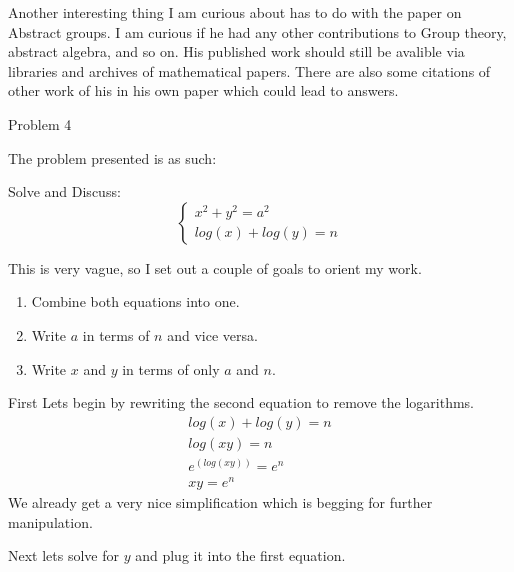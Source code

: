 \documentclass{report}
\begin{document}
\begin{description}
\begin{mdframed}
            Another interesting thing I am curious about has to do
            with the paper on Abstract groups. I am curious if he
            had any other contributions to Group theory,
            abstract algebra, and so on. His published work should
            still be avalible via libraries and archives of mathematical
            papers. There are also some citations of other work of
            his in his own paper which could lead to answers.
        \end{mdframed}
    \item {\large Problem 4}
        \begin{mdframed}
            The problem presented is as such: 
            \begin{mdframed}
                Solve and Discuss:
                \begin{displaymath}
                    \begin{cases}
                        x^2 + y^2 = a^2\\ 
                        log(x) + log(y) = n
                    \end{cases}
                \end{displaymath}
            \end{mdframed}

            This is very vague, so I set out a couple of goals
            to orient my work.
            \begin{enumerate}
                \item Combine both equations into one.
                \item Write $a$ in terms of $n$ and vice versa.
                \item Write $x$ and $y$ in terms of only
                    $a$ and $n$.
            \end{enumerate}

            First Lets begin by rewriting the second
            equation to remove the logarithms.
            \begin{gather}
                log(x) + log(y) = n\\ 
                log(xy) = n\\
                e^(log(xy)) = e^n\\
                xy = e^n 
            \end{gather}
            We already get a very nice simplification which
            is begging for further manipulation.
        \end{mdframed}
        \begin{mdframed}
            Next lets solve for $y$ and plug it into the
            first equation.


\end{mdframed}
\end{description}
\end{document}
